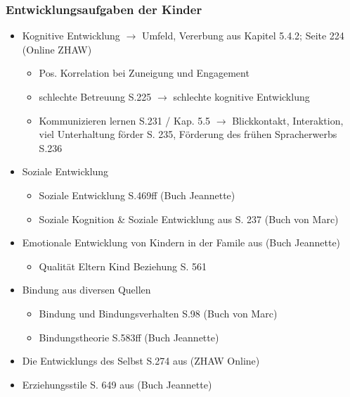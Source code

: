 \subsubsection{Entwicklungsaufgaben der Kinder}\label{sec:Entwicklungsaufgaben}

\begin{itemize}
    \item Kognitive Entwicklung $\rightarrow$ Umfeld, Vererbung aus  Kapitel 5.4.2; Seite 224 (Online ZHAW)
    \begin{itemize}
        \item Pos. Korrelation bei Zuneigung und Engagement
        \item schlechte Betreuung S.225 $\rightarrow$ schlechte kognitive Entwicklung
        \item Kommunizieren lernen S.231 / Kap. 5.5 $\rightarrow$ Blickkontakt, Interaktion, viel Unterhaltung förder S. 235, Förderung des frühen Spracherwerbs S.236
    \end{itemize}
    \item Soziale Entwicklung
    \begin{itemize}
        \item Soziale Entwicklung S.469ff  (Buch Jeannette)
        \item Soziale Kognition \& Soziale Entwicklung aus  S. 237 (Buch von Marc)
    \end{itemize}
    \item Emotionale Entwicklung von Kindern in der Famile aus  (Buch Jeannette)
    \begin{itemize}
        \item Qualität Eltern Kind Beziehung S. 561
    \end{itemize}
    \item Bindung aus diversen Quellen
    \begin{itemize}
        \item Bindung und Bindungsverhalten S.98  (Buch von Marc)
        \item Bindungstheorie S.583ff  (Buch Jeannette)
    \end{itemize}
    \item Die Entwicklungs des Selbst S.274 aus  (ZHAW Online) 
    \item Erziehungsstile S. 649 aus  (Buch Jeannette)
\end{itemize}



